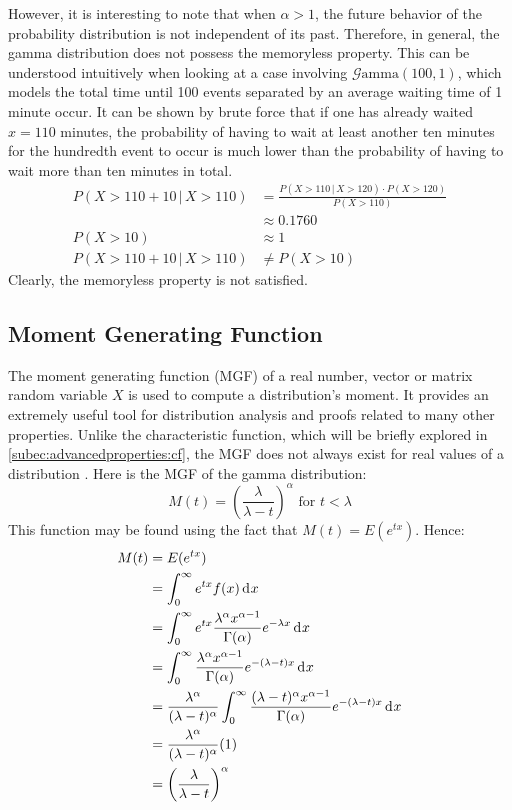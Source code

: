 \documentclass[12pt]{article}
\newcommand{\G}{\mathcal{G}}
\begin{document}
However, it is interesting to note that when $\alpha>1$, the future behavior of the probability distribution  is not
independent of its past. Therefore, in general, the gamma distribution does not possess the memoryless property. This
can be understood intuitively when looking at a case involving $\G\text{amma}(100, 1)$, which models the total time
until 100 events separated by an average waiting time of 1 minute occur. It can be shown by brute force that if one has
already waited $x=110$ minutes, the probability of having to wait at least another ten minutes for the hundredth event
to occur is much lower than the probability of having to wait more than ten minutes in total\cite{myersCS547Lecture,
probabilitycourseExponentialDistribution}.
\begin{equation}
	\begin{split}
		P(X>110+10\, |\, X>110)	&=			\frac{P(X>110\, |\, X>120)\cdot P(X>120)}{P(X>110)}\\
								&\approx	0.1760\\
		P(X>10)					&\approx	1\\
		P(X>110+10\, |\, X>110)	&\neq		P(X>10)
	\end{split}
\end{equation}
Clearly, the memoryless property is not satisfied.


\subsection{Moment Generating Function}\label{subsec:gamma:mgf}
The moment generating function (MGF) of a real number, vector or matrix random variable $X$ is used to compute a
distribution's moment. It provides an extremely useful tool for distribution analysis and proofs related to many other
properties. Unlike the characteristic function, which will be briefly explored in \autoref{subec:advancedproperties:cf},
the MGF does not always exist for real values of a distribution \cite{wikipediaMomentgeneratingFunction2022}. Here is
the MGF of the gamma distribution:
\begin{equation}
	M(t)=\left(\frac{\lambda}{\lambda-t}\right)^\alpha\text{ for }t<\lambda
\end{equation}
This function may be found using the fact that $M(t)=E(e^{tx})$. Hence:
\begin{equation}
	\begin{split}
		M(t)	&=	E(e^{tx})\\
				&=	\int^\infty_0 e^{tx}f(x)\mathop{}\!\mathrm{d^{}}x\\
				&=	\int^\infty_0 e^{tx}\frac{\lambda^\alpha x^{\alpha-1}}{\Gamma(\alpha)}e^{-\lambda x}\mathop{}\!\mathrm{d^{}}x\\
				&=	\int^\infty_0 \frac{\lambda^\alpha x^{\alpha-1}}{\Gamma(\alpha)}e^{-(\lambda-t) x}\mathop{}\!\mathrm{d^{}}x\\
				&=	\frac{\lambda^\alpha}{(\lambda-t)^\alpha}\int^\infty_0 \frac{(\lambda-t)^\alpha x^{\alpha-1}}{\Gamma(\alpha)}e^{-(\lambda-t) x}\mathop{}\!\mathrm{d^{}}x\\
				&=	\frac{\lambda^\alpha}{(\lambda-t)^\alpha}(1)\\
				&=	\left(\frac{\lambda}{\lambda-t}\right)^\alpha
	\end{split}
\end{equation}
\end{document}
